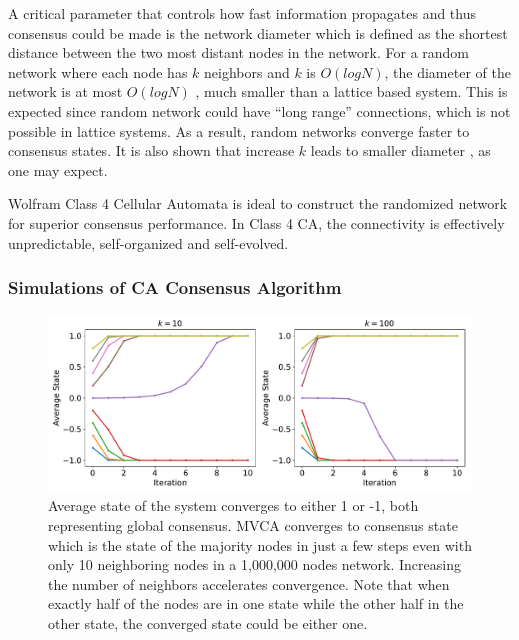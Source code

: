 \documentclass[reprint,pre,aps]{revtex4-1}
\begin{document}
A critical parameter that controls how fast information propagates and thus consensus could be made is the network diameter which is defined as the shortest distance between the two most distant nodes in the network. For a random network where each node has $k$ neighbors and $k$ is $O(log N)$, the diameter of the network is at most $O(log N)$ \cite{chung2001diameter}, much smaller than a lattice based system. This is expected since random network could have “long range” connections, which is not possible in lattice systems. As a result, random networks converge faster to consensus states. It is also shown that increase $k$ leads to smaller diameter \cite{chung2001diameter}, as one may expect.

Wolfram Class 4 Cellular Automata is ideal to construct the randomized network for superior consensus performance. In Class 4 CA, the connectivity is effectively unpredictable, self-organized and self-evolved.

\subsubsection{Simulations of CA Consensus Algorithm}

\begin{figure}[!htp]
\centering
\includegraphics[width=\linewidth]{fig/consensus_convergence}
\caption{Average state of the system converges to either 1 or -1, both representing global consensus. MVCA converges to consensus state which is the state of the majority nodes in just a few steps even with only 10 neighboring nodes in a 1,000,000 nodes network. Increasing the number of neighbors accelerates convergence. Note that when exactly half of the nodes are in one state while the other half in the other state, the converged state could be either one.}
\label{fig:consensus_convergence}
\end{figure}
\end{document}
